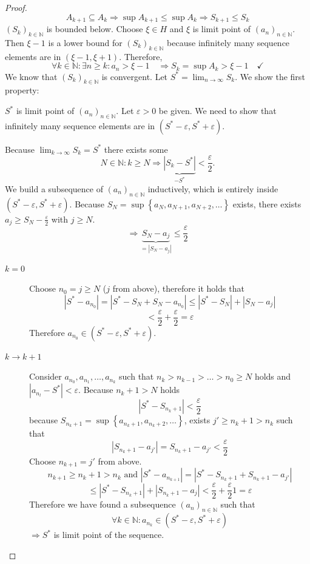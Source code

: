 \documentclass[a4paper,landscape,twocolumn]{article}
\theoremstyle{definition}
\newcommand\set[1]{\left\{#1\right\}}
\newcommand\abs[1]{\left|#1\right|}
\newcommand\seq[1]{{\left(#1\right)}_{n \in \mathbb N}}
\begin{document}
\begin{proof}
  \[ A_{k+1} \subseteq A_k \Rightarrow \sup{A_{k+1}} \leq \sup{A_{k}} \Rightarrow S_{k+1} \leq S_k \]
  $\left(S_k\right)_{k\in\mathbb N}$ is bounded below. Choose
  $\xi \in H$ and $\xi$ is limit point of $\seq{a_n}$.
  Then $\xi - 1$ is a lower bound for $\left(S_k\right)_{k\in\mathbb N}$ because infinitely many sequence elements
  are in $(\xi - 1, \xi + 1)$.
  Therefore,
  \[
    \forall k \in \mathbb N: \exists n \geq k: a_n > \xi - 1
    \quad\Rightarrow S_k = \sup{A_k} > \xi - 1
    \quad\checkmark
  \]
  We know that $\left(S_k\right)_{k\in\mathbb N}$ is convergent. Let $S^* = \lim_{n\to\infty} S_k$.
  We show the first property:

  $S^*$ is limit point of $\left(a_n\right)_{n\in\mathbb N}$.
  Let $\varepsilon > 0$ be given. We need to show that infinitely many sequence elements
  are in $(S^* - \varepsilon, S^* + \varepsilon)$.

  Because $\lim_{k\to\infty} S_k = S^*$ there exists some
  \[ N \in \mathbb N: k \geq N \Rightarrow \underbrace{\abs{S_k - S^*}}_{-S^*} < \frac\varepsilon2. \]
  We build a subsequence of $\seq{a_n}$ inductively, which is entirely inside $(S^* - \varepsilon, S^* + \varepsilon)$.
  Because $S_N = \sup\set{a_N, a_{N+1}, a_{N+2}, \dots}$ exists, there exists $a_j \geq S_N - \frac\varepsilon2$ with $j \geq N$.
  \[ \Rightarrow \underbrace{S_N - a_j}_{=\abs{S_N - a_j}} \leq \frac\varepsilon2 \]
  \begin{description}
    \item[$k = 0$]
      Choose $n_0 = j \geq N$ ($j$ from above), therefore it holds that
      \[
        \abs{S^* - a_{n_0}} = \abs{S^* - S_N + S_N - a_{n_0}} \leq \abs{S^* - S_N} + \abs{S_N - a_j}
      \] \[
        < \frac\varepsilon2 + \frac\varepsilon2
        = \varepsilon
      \]
      Therefore $a_{n_0} \in (S^* - \varepsilon, S^* + \varepsilon)$.
    \item[$k \to k+1$]
      Consider $a_{n_0}, a_{n_1}, \dots, a_{n_k}$ such that $n_k > n_{k-1} > \dots > n_0 \geq N$ holds
      and $\abs{a_{n_l} - S^*} < \varepsilon$. Because $n_k + 1 > N$ holds
      \[ \abs{S^* - S_{n_k + 1}} < \frac\varepsilon2 \]
      because $S_{n_k + 1} = \sup\set{a_{n_k + 1}, a_{n_k + 2}, \dots}$,
      exists ${j'} \geq n_k + 1 > n_k$ such that
      \[ \abs{S_{n_k + 1} - a_{j'}} = S_{n_k + 1} - a_{j'} < \frac\varepsilon2 \]
      Choose $n_{k+1} = {j'}$ from above.
      \[ n_{k+1} \geq n_k + 1 > n_k \text{ and } \abs{S^* - a_{n_{k+1}}} = \abs{S^* - S_{n_k + 1} + S_{n_k + 1} - a_{j'}} \]
      \[ \leq \abs{S^* - S_{n_k + 1}} + \abs{S_{n_k + 1} - a_{j}} < \frac\varepsilon2 + \frac\varepsilon21 = \varepsilon \]
      Therefore we have found a subsequence $\left(a_n\right)_{n\in\mathbb N}$ such that
      \[ \forall k \in \mathbb N: a_{n_k} \in (S^* - \varepsilon, S^* + \varepsilon) \]
      $\Rightarrow S^*$ is limit point of the sequence.


\end{description}
\end{proof}
\end{document}
